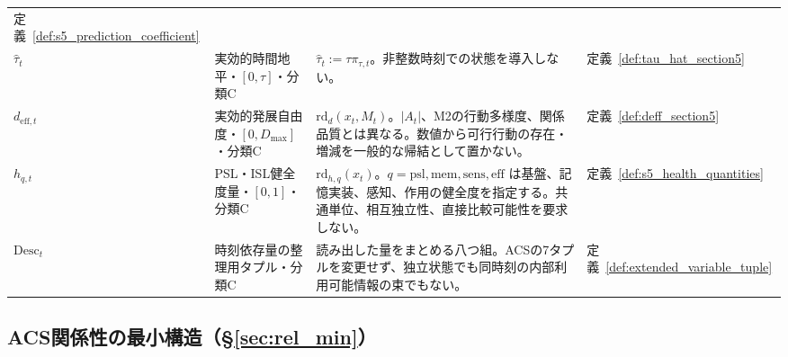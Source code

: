 \begin{longtable}{p{3.0cm} p{3.0cm} p{6.6cm} p{2.0cm}}
定義~\ref{def:s5_prediction_coefficient} \\[3pt]
$\widehat\tau_t$ & 実効的時間地平・$[0,\tau]$・分類C &
$\widehat\tau_t:=\tau\pi_{\tau,t}$。非整数時刻での状態を導入しない。 &
定義~\ref{def:tau_hat_section5} \\[3pt]
$d_{\mathrm{eff},t}$ & 実効的発展自由度・$[0,D_{\max}]$・分類C &
$\mathrm{rd}_d(x_t,M_t)$。$|A_t|$、M2の行動多様度、関係品質とは異なる。数値から可行行動の存在・増減を一般的な帰結として置かない。 &
定義~\ref{def:deff_section5} \\[3pt]
$h_{q,t}$ & PSL・ISL健全度量・$[0,1]$・分類C &
$\mathrm{rd}_{h,q}(x_t)$。$q=\mathrm{psl},\mathrm{mem},\mathrm{sens},\mathrm{eff}$ は基盤、記憶実装、感知、作用の健全度を指定する。共通単位、相互独立性、直接比較可能性を要求しない。 &
定義~\ref{def:s5_health_quantities} \\[3pt]
$\mathrm{Desc}_t$ & 時刻依存量の整理用タプル・分類C &
読み出した量をまとめる八つ組。ACSの7タプルを変更せず、独立状態でも同時刻の内部利用可能情報の束でもない。 &
定義~\ref{def:extended_variable_tuple} \\[3pt]
\end{longtable}
\endgroup

\subsection{ACS関係性の最小構造（\S\ref{sec:rel_min}）}
\label{app:symbols_s6}

